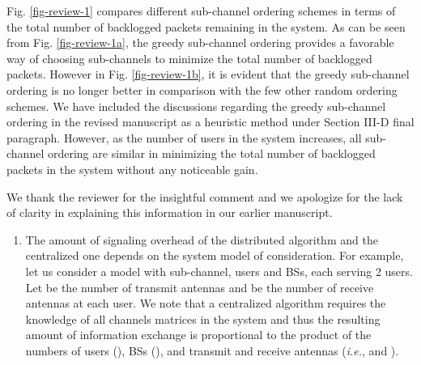 \begin{enumerate}
Fig. \ref{fig-review-1} compares different sub-channel ordering schemes in terms of the total number of backlogged packets remaining in the system. As can be seen from Fig. \ref{fig-review-1a}, the greedy sub-channel ordering provides a favorable way of choosing sub-channels to minimize the total number of backlogged packets. However in Fig. \ref{fig-review-1b}, it is evident that the greedy sub-channel ordering is no longer better in comparison with the few other random ordering schemes. We have included the discussions regarding the greedy sub-channel ordering in the revised manuscript as a heuristic method under Section III-D final paragraph. However, as the number of users in the system increases, all sub-channel ordering are similar in minimizing the total number of backlogged packets in the system without any noticeable gain.

 

\resp
	We thank the reviewer for the insightful comment and we apologize for the lack of clarity in explaining this information in our earlier manuscript.
	\begin{enumerate}
		\item The amount of signaling overhead of the distributed algorithm and the centralized one depends on the system model of consideration. For example, let us consider a model with  sub-channel,  users and  \acp{BS}, each serving 2 users. Let  be the number of transmit antennas and  be the number of receive antennas at each user. We note that a centralized algorithm requires the knowledge of all channels matrices in the system and thus the resulting amount of information exchange is proportional to the product of the numbers of users (), \acp{BS} (), and transmit and receive antennas (\textit{i.e.},  and ).
		

\end{enumerate}
\end{enumerate}
